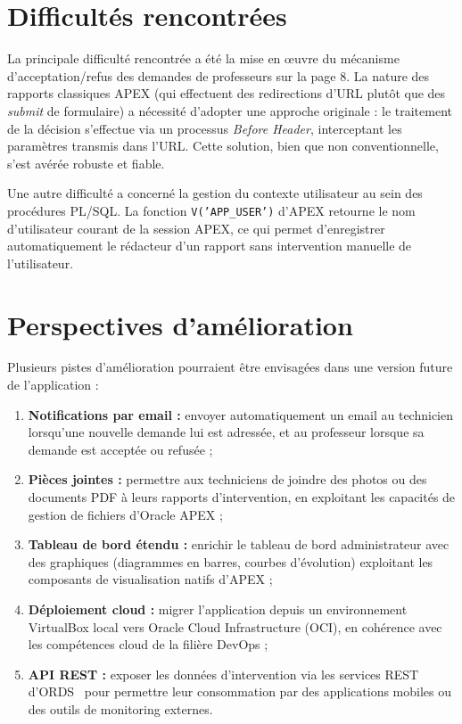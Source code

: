 \documentclass[12pt,a4paper,oneside]{report}
\begin{document}
\section*{Difficultés rencontrées}

La principale difficulté rencontrée a été la mise en œuvre du mécanisme d'acceptation/refus des demandes de professeurs sur la page 8. La nature des rapports classiques APEX (qui effectuent des redirections d'URL plutôt que des \textit{submit} de formulaire) a nécessité d'adopter une approche originale : le traitement de la décision s'effectue via un processus \textit{Before Header}, interceptant les paramètres transmis dans l'URL. Cette solution, bien que non conventionnelle, s'est avérée robuste et fiable.

Une autre difficulté a concerné la gestion du contexte utilisateur au sein des procédures PL/SQL. La fonction \texttt{V('APP\_USER')} d'APEX retourne le nom d'utilisateur courant de la session APEX, ce qui permet d'enregistrer automatiquement le rédacteur d'un rapport sans intervention manuelle de l'utilisateur.

\section*{Perspectives d'amélioration}

Plusieurs pistes d'amélioration pourraient être envisagées dans une version future de l'application :

\begin{enumerate}[leftmargin=2em]
  \item \textbf{Notifications par email :} envoyer automatiquement un email au technicien lorsqu'une nouvelle demande lui est adressée, et au professeur lorsque sa demande est acceptée ou refusée ;
  \item \textbf{Pièces jointes :} permettre aux techniciens de joindre des photos ou des documents PDF à leurs rapports d'intervention, en exploitant les capacités de gestion de fichiers d'Oracle APEX ;
  \item \textbf{Tableau de bord étendu :} enrichir le tableau de bord administrateur avec des graphiques (diagrammes en barres, courbes d'évolution) exploitant les composants de visualisation natifs d'APEX ;
  \item \textbf{Déploiement cloud :} migrer l'application depuis un environnement VirtualBox local vers Oracle Cloud Infrastructure (OCI), en cohérence avec les compétences cloud de la filière DevOps ;
  \item \textbf{API REST :} exposer les données d'intervention via les services REST d'ORDS~\cite{ords_guide} pour permettre leur consommation par des applications mobiles ou des outils de monitoring externes.
\end{enumerate}
\end{document}
